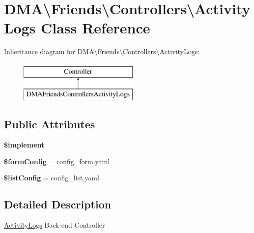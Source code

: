\hypertarget{classDMA_1_1Friends_1_1Controllers_1_1ActivityLogs}{}\section{D\+M\+A\textbackslash{}Friends\textbackslash{}Controllers\textbackslash{}Activity\+Logs Class Reference}
\label{classDMA_1_1Friends_1_1Controllers_1_1ActivityLogs}
Inheritance diagram for D\+M\+A\textbackslash{}Friends\textbackslash{}Controllers\textbackslash{}Activity\+Logs\+:\begin{figure}[H]
\begin{center}
\leavevmode
\includegraphics[height=2.000000cm]{d4/d23/classDMA_1_1Friends_1_1Controllers_1_1ActivityLogs}
\end{center}
\end{figure}
\subsection*{Public Attributes}
\begin{DoxyCompactItemize}
\item 
{\bfseries \$implement}
\item 
\hypertarget{classDMA_1_1Friends_1_1Controllers_1_1ActivityLogs_a2b07b2999d34d646303a3d70ade2da0a}{}{\bfseries \$form\+Config} = \textquotesingle{}config\+\_\+form.\+yaml\textquotesingle{}\label{classDMA_1_1Friends_1_1Controllers_1_1ActivityLogs_a2b07b2999d34d646303a3d70ade2da0a}

\item 
\hypertarget{classDMA_1_1Friends_1_1Controllers_1_1ActivityLogs_a4f2d381656dbf1241a60f5b404a6230b}{}{\bfseries \$list\+Config} = \textquotesingle{}config\+\_\+list.\+yaml\textquotesingle{}\label{classDMA_1_1Friends_1_1Controllers_1_1ActivityLogs_a4f2d381656dbf1241a60f5b404a6230b}

\end{DoxyCompactItemize}


\subsection{Detailed Description}
\hyperlink{classDMA_1_1Friends_1_1Controllers_1_1ActivityLogs}{Activity\+Logs} Back-\/end Controller 

